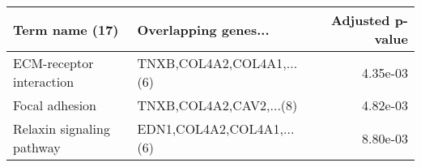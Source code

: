 \begin{tabular}{llr}
\toprule
           Term name (17) &      Overlapping genes... &  Adjusted p-value \\
\midrule
 ECM-receptor interaction & TNXB,COL4A2,COL4A1,...(6) &          4.35e-03 \\
           Focal adhesion &   TNXB,COL4A2,CAV2,...(8) &          4.82e-03 \\
Relaxin signaling pathway & EDN1,COL4A2,COL4A1,...(6) &          8.80e-03 \\
\bottomrule
\end{tabular}

